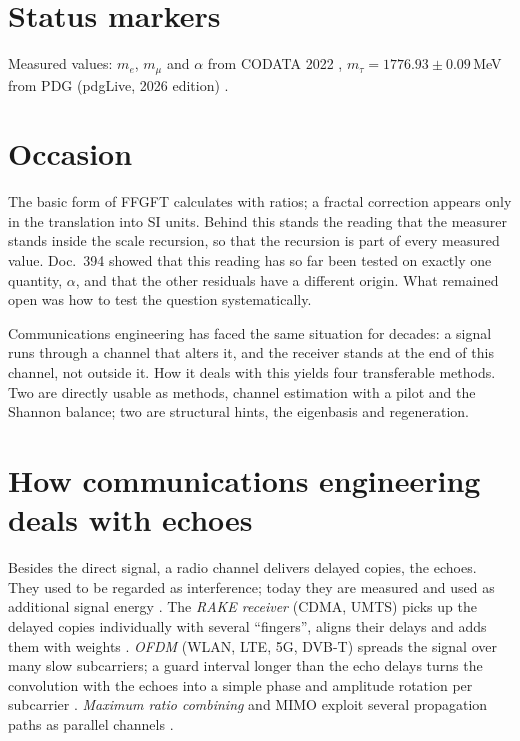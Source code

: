\section*{Status markers}

Measured values: $m_e$, $m_\mu$ and $\alpha$ from CODATA 2022 \QM, $m_\tau=1776.93\pm0.09$\,MeV from
PDG (pdgLive, 2026 edition) \QM.

\section{Occasion}

The basic form of FFGFT calculates with ratios; a fractal correction appears only in the translation
into SI units. Behind this stands the reading that the measurer stands inside the scale recursion, so
that the recursion is part of every measured value. Doc.~394 showed that this reading has so far been
tested on exactly one quantity, $\alpha$, and that the other residuals have a different origin. What
remained open was how to test the question systematically.

Communications engineering has faced the same situation for decades: a signal runs through a channel
that alters it, and the receiver stands at the end of this channel, not outside it. How it deals with
this yields four transferable methods. Two are directly usable as methods, channel estimation with a
pilot and the Shannon balance; two are structural hints, the eigenbasis and regeneration.

\section{How communications engineering deals with echoes}

Besides the direct signal, a radio channel delivers delayed copies, the echoes. They used to be
regarded as interference; today they are measured and used as additional signal energy \QM. The
\emph{RAKE receiver} (CDMA, UMTS) picks up the delayed copies individually with several
\enquote{fingers}, aligns their delays and adds them with weights \cite{PriceGreen1958}. \emph{OFDM}
(WLAN, LTE, 5G, DVB-T) spreads the signal over many slow subcarriers; a guard interval longer than the
echo delays turns the convolution with the echoes into a simple phase and amplitude rotation per
subcarrier \cite{WeinsteinEbert1971}. \emph{Maximum ratio combining} and MIMO exploit several
propagation paths as parallel channels \cite{Brennan1959}.

